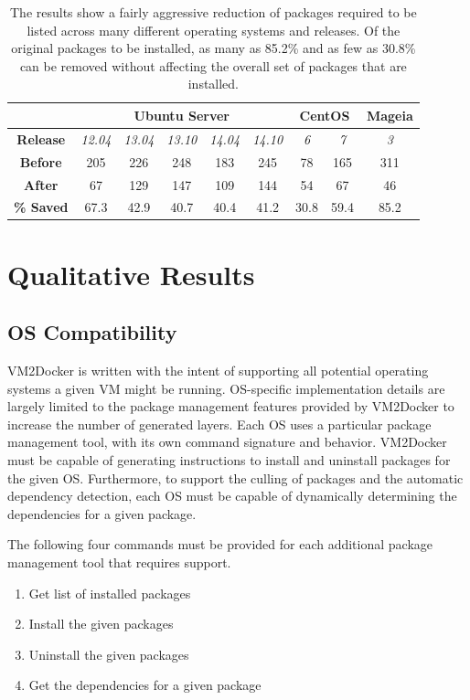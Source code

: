 \begin{table}[h]
\centering

    \begin{tabular}{| c | c | c | c | c | c | c | c | c |}
    \hline
& \multicolumn{5}{|c|}{\bfseries Ubuntu Server} & \multicolumn{2}{|c|}{\bfseries CentOS} & \multicolumn{1}{|c|}{\bfseries Mageia} \\ \hline
    \bfseries Release & \itshape 12.04 & \itshape 13.04 & \itshape 13.10 & \itshape 14.04 & \itshape 14.10  & \itshape 6 & \itshape 7 & \itshape 3 \\ \hline
    \bfseries Before & 205 & 226 & 248 & 183 & 245 & 78 & 165 & 311\\ \hline
    \bfseries After & 67 & 129 & 147 & 109 & 144 & 54 & 67 & 46   \\ \hline \hline
    \bfseries \% Saved & 67.3 & 42.9 & 40.7 & 40.4 & 41.2 & 30.8 & 59.4 & 85.2\\
    \hline
    \end{tabular}
\caption{The results show a fairly aggressive reduction of packages required to be listed across many different operating systems and releases. Of the original packages to be installed, as many as 85.2\% and as few as 30.8\% can be removed without affecting the overall set of packages that are installed.}
\label{table:culling}
\end{table}

\section{Qualitative Results}
\subsection{OS Compatibility}
VM2Docker is written with the intent of supporting all potential operating systems a given VM might be running. OS-specific implementation details are largely limited to the package management features provided by VM2Docker to increase the number of generated layers. Each OS uses a particular package management tool, with its own command signature and behavior. VM2Docker must be capable of generating instructions to install and uninstall packages for the given OS. Furthermore, to support the culling of packages and the automatic dependency detection, each OS must be capable of dynamically determining the dependencies for a given package.

The following four commands must be provided for each additional package management tool that requires support. 
\begin{enumerate}
\item Get list of installed packages
\item Install the given packages
\item Uninstall the given packages
\item Get the dependencies for a given package
\end{enumerate}

